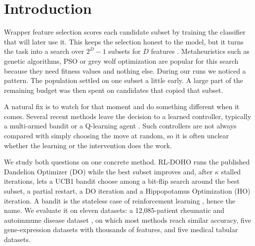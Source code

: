 \documentclass[pdflatex,sn-basic]{sn-jnl}
\begin{document}
\maketitle

\section{Introduction}

Wrapper feature selection scores each candidate subset by training the classifier that will later use it. This keeps the selection honest to the model, but it turns the task into a search over $2^D-1$ subsets for $D$ features \citep{kohavi1997,xue2016}. Metaheuristics such as genetic algorithms, PSO or grey wolf optimization are popular for this search because they need fitness values and nothing else. During our runs we noticed a pattern. The population settled on one subset a little early. A large part of the remaining budget was then spent on candidates that copied that subset.

A natural fix is to watch for that moment and do something different when it comes. Several recent methods leave the decision to a learned controller, typically a multi-armed bandit or a Q-learning agent \citep{fialho2010,karafotias2015,hu2023rlgwo,hashjin2025q2ho}. Such controllers are not always compared with simply choosing the move at random, so it is often unclear whether the learning or the intervention does the work.

We study both questions on one concrete method. RL-DOHO runs the published Dandelion Optimizer (DO) \citep{zhao2022do} while the best subset improves and, after $\kappa$ stalled iterations, lets a UCB1 bandit \citep{auer2002} choose among a bit-flip search around the best subset, a partial restart, a DO iteration and a Hippopotamus Optimization (HO) \citep{amiri2024ho} iteration. A bandit is the stateless case of reinforcement learning \citep{sutton2018}, hence the name. We evaluate it on eleven datasets: a 12,085-patient rheumatic and autoimmune disease dataset \citep{mahdi2025data}, on which most methods reach similar accuracy, five gene-expression datasets with thousands of features, and five medical tabular datasets.
\end{document}
